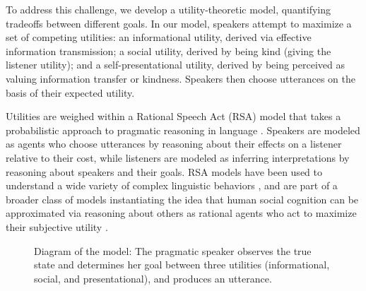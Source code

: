 \documentclass[12pt]{article}
\begin{document}

To address this challenge, we develop a utility-theoretic model, quantifying tradeoffs between different goals. In our model, speakers attempt to maximize a set of competing
utilities: an informational utility, derived via effective
information transmission; a social utility, derived by being kind (giving the listener utility); and a self-presentational utility, derived
by being perceived as valuing information transfer or kindness.
Speakers then choose utterances on the basis of their
expected utility.


Utilities are weighed within a Rational Speech Act (RSA) model that
takes a probabilistic approach to pragmatic reasoning in language \cite{frank2012, goodman2016}. Speakers are modeled as agents
who choose utterances by reasoning about their effects on a listener
relative to their cost, while listeners are modeled as inferring
interpretations by reasoning about speakers and their goals.  RSA models have been used to understand a wide variety of complex
linguistic behaviors \cite{lassiter2017adjectival, kao2014, kao2015}, and are part of a broader class of models instantiating the idea that human social cognition can be approximated via reasoning about others as rational agents who act to maximize their subjective utility \cite{baker2009action,jara2016naive, liu2017ten}.

\begin{figure}
\centering
\caption{\label{fig:model}Diagram of the model: The pragmatic speaker observes the true state and determines her goal between three utilities (informational, social, and presentational), and produces an utterance.
}
\end{figure}
\end{document}
